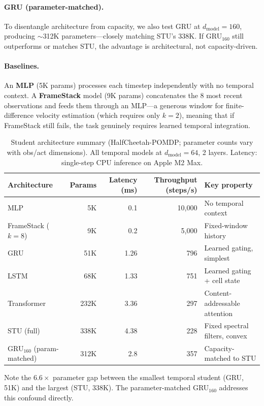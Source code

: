 \paragraph{GRU (parameter-matched).}
To disentangle architecture from capacity, we also test GRU at $d_\text{model} = 160$, producing $\sim$312K parameters---closely matching STU's 338K.
If GRU$_{160}$ still outperforms or matches STU, the advantage is architectural, not capacity-driven.

\paragraph{Baselines.}
An \textbf{MLP} (5K params) processes each timestep independently with no temporal context.
A \textbf{FrameStack} model (9K params) concatenates the 8 most recent observations and feeds them through an MLP---a generous window for finite-difference velocity estimation (which requires only $k{=}2$), meaning that if FrameStack still fails, the task genuinely requires learned temporal integration.

\begin{table}[ht]
\centering
\caption{Student architecture summary (HalfCheetah-POMDP; parameter counts vary with obs/act dimensions). All temporal models at $d_\text{model}=64$, 2 layers. Latency: single-step CPU inference on Apple M2 Max.}
\label{tab:arch-summary}
\begin{tabular}{lrrrl}
\toprule
Architecture & Params & Latency (ms) & Throughput (steps/s) & Key property \\
\midrule
MLP             &   5K & 0.1 & 10{,}000 & No temporal context \\
FrameStack ($k{=}8$) &  9K & 0.2 & 5{,}000 & Fixed-window history \\
GRU             &  51K & 1.26 & 796 & Learned gating, simplest \\
LSTM            &  68K & 1.33 & 751 & Learned gating + cell state \\
Transformer     & 232K & 3.36 & 297 & Content-addressable attention \\
STU (full)      & 338K & 4.38 & 228 & Fixed spectral filters, convex \\
\midrule
GRU$_{160}$ (param-matched) & 312K & 2.8 & 357 & Capacity-matched to STU \\
\bottomrule
\end{tabular}
\end{table}

Note the $6.6\times$ parameter gap between the smallest temporal student (GRU, 51K) and the largest (STU, 338K).
The parameter-matched GRU$_{160}$ addresses this confound directly.

